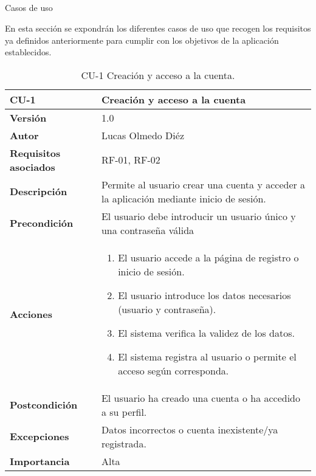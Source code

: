 \subsection{}{Casos de uso}

En esta sección se expondrán los diferentes casos de uso que recogen los requisitos ya definidos anteriormente para cumplir con los objetivos de la aplicación establecidos.

\clearpage
\begin{table}[p]
	\centering
	\begin{tabularx}{\linewidth}{ p{} p{} }
        \toprule
        \textbf{CU-1}    & \textbf{Creación y acceso a la cuenta} \\
        \toprule
        \textbf{Versión}              & 1.0 \\
        \textbf{Autor}                & Lucas Olmedo Diéz \\
        \textbf{Requisitos asociados} & RF-01, RF-02 \\
        \textbf{Descripción}          & Permite al usuario crear una cuenta y acceder a la aplicación mediante inicio de sesión. \\
        \textbf{Precondición}         & El usuario debe introducir un usuario único y una contraseña válida \\
        \textbf{Acciones}             &
        \begin{enumerate}
            \def\labelenumi{\arabic{enumi}.}
            \tightlist
            \item El usuario accede a la página de registro o inicio de sesión.
            \item El usuario introduce los datos necesarios (usuario y contraseña).
            \item El sistema verifica la validez de los datos.
            \item El sistema registra al usuario o permite el acceso según corresponda.
        \end{enumerate}\\
        \textbf{Postcondición}        & El usuario ha creado una cuenta o ha accedido a su perfil. \\
        \textbf{Excepciones}          & Datos incorrectos o cuenta inexistente/ya registrada. \\
        \textbf{Importancia}          & Alta \\
        \bottomrule
    \end{tabularx}
    \caption{CU-1 Creación y acceso a la cuenta.}
\end{table}

